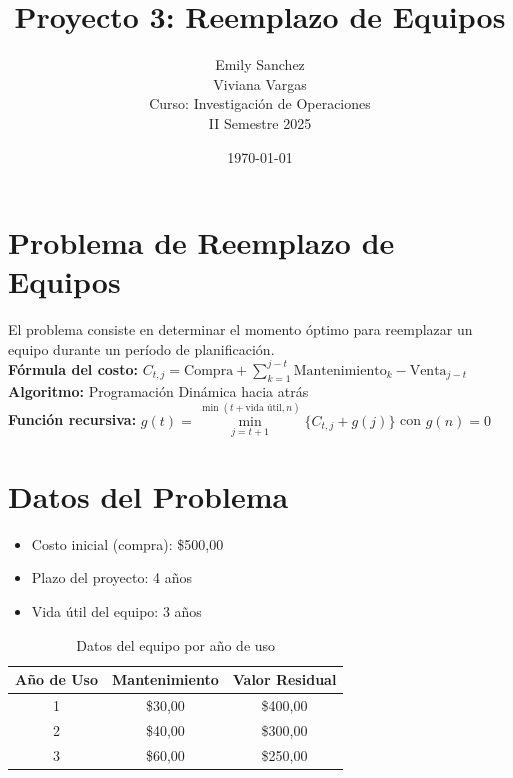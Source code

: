 \documentclass[12pt]{article}
\title{Proyecto 3: Reemplazo de Equipos}
\author{Emily Sanchez \\ Viviana Vargas \\[1cm] Curso: Investigación de Operaciones \\ II Semestre 2025}
\date{\today}
\begin{document}
\maketitle
\newpage
\section*{Problema de Reemplazo de Equipos}
El problema consiste en determinar el momento óptimo para reemplazar un equipo durante un período de planificación.\\
\textbf{Fórmula del costo:} $C_{t,j} = \text{Compra} + \sum_{k=1}^{j-t} \text{Mantenimiento}_k - \text{Venta}_{j-t}$\\
\textbf{Algoritmo:} Programación Dinámica hacia atrás\\
\textbf{Función recursiva:} $g(t) = \min\limits_{j=t+1}^{\min(t+\text{vida útil}, n)} \{C_{t,j} + g(j)\}$ con $g(n) = 0$\\

\section*{Datos del Problema}
\begin{itemize}
\item Costo inicial (compra): \$500,00
\item Plazo del proyecto: 4 años
\item Vida útil del equipo: 3 años
\end{itemize}

\begin{table}[H]
\centering
\caption{Datos del equipo por año de uso}
\begin{tabular}{ccc}
\toprule
Año de Uso & Mantenimiento & Valor Residual \\
\midrule
1 & \$30,00 & \$400,00 \\
2 & \$40,00 & \$300,00 \\
3 & \$60,00 & \$250,00 \\
\bottomrule
\end{tabular}
\end{table}

\clearpage
\end{document}
